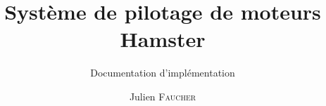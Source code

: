 \documentclass[a4paper,french]{report}
\author{Julien \textsc{Faucher}}
\title{Système de pilotage de moteurs Hamster}
\subtitle{Documentation d'implémentation}
\begin{document}
\makepagegarde
\tableofcontents 
\listoffigures



\end{document}
